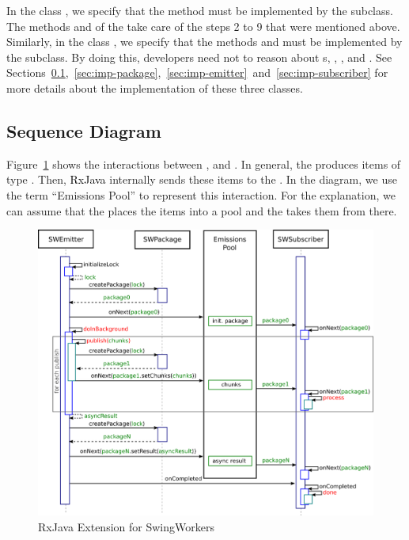 \documentclass[type=bsc,accentcolor=tud9c]{tudthesis}
\newcommand{\framework}[1]{\textcolor{black}{#1}}
\begin{document}
In the class , we specify that the method  must be implemented by the subclass. The methods  and  of the  take care of the steps 2 to 9 that were mentioned above. Similarly, in the class , we specify that the methods  and  must be implemented by the subclass. By doing this, developers need not to reason about s, , ,  and . See Sections~\ref{sec:imp-seq-diagram},~\ref{sec:imp-package},~\ref{sec:imp-emitter}~and~\ref{sec:imp-subscriber} for more details about the implementation of these three classes.

\subsection{Sequence Diagram}
\label{sec:imp-seq-diagram}

Figure~\ref{fig:rxjava-extension} shows the interactions between ,  and . In general, the  produces items of type . Then, \framework{RxJava} internally sends these items to the . In the diagram, we use the term ``Emissions Pool'' to represent this interaction. For the explanation, we can assume that the  places the items into a pool and the  takes them from there.

\begin{figure}[h]
\begin{center}
\includegraphics[width=15.5cm]{design/rxjava-extension.png}
\end{center}
\caption{RxJava Extension for SwingWorkers}
\label{fig:rxjava-extension}
\end{figure}
\end{document}
